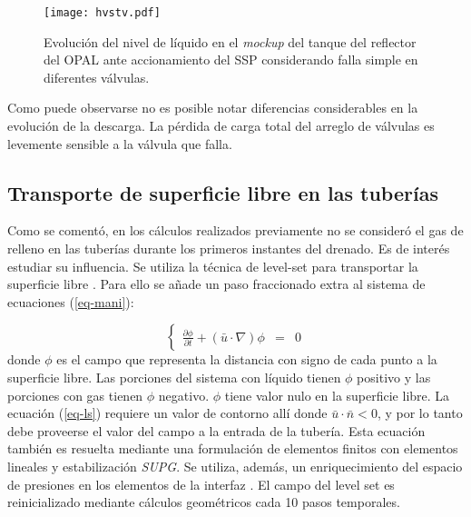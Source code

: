 \begin{figure}[ht]
\centering
\texttt{[image: hvstv.pdf]}
\caption[Evolución del nivel de líquido en el \textit{mockup} del tanque del reflector del OPAL ante accionamiento del SSP considerando falla simple en diferentes válvulas]
{Evolución del nivel de líquido en el \textit{mockup} del tanque del reflector del OPAL ante accionamiento del SSP considerando falla simple en diferentes válvulas.}
\label{hvstv} 
\end{figure}

Como puede observarse no es posible notar diferencias considerables en la evolución de la descarga.
La pérdida de carga total del arreglo de válvulas es levemente sensible a la válvula que falla.

\subsection*{Transporte de superficie libre en las tuberías}
\label{3:level-set}

Como se comentó, en los cálculos realizados previamente no se consideró el gas de relleno en las tuberías durante los primeros instantes del drenado.
Es de interés estudiar su influencia.
Se utiliza la técnica de level-set para transportar la superficie libre \cite{level-set}.
Para ello se añade un paso fraccionado extra al sistema de ecuaciones (\ref{eq-mani}):

\begin{equation}
\left\{ \begin{array}{rcl}
\displaystyle \frac{\partial\phi}{\partial t}+ (\bar{u} \cdot \nabla) \phi &=& 0
\label{eq-ls}
\end{array} \right.
\end{equation}
donde $\phi$ es el campo que representa la distancia con signo de cada punto a la superficie libre.
Las porciones del sistema con líquido tienen $\phi$ positivo y las porciones con gas tienen $\phi$ negativo.
$\phi$ tiene valor nulo en la superficie libre.
La ecuación (\ref{eq-ls}) requiere un valor de contorno allí donde $\bar{u} \cdot \bar{n} < 0$,
y por lo tanto debe proveerse el valor del campo a la entrada de la tubería.
Esta ecuación también es resuelta mediante una formulación de elementos finitos con elementos lineales y estabilización \textit{SUPG}.
Se utiliza, además, un enriquecimiento del espacio de presiones en los elementos de la interfaz \cite{enriq}.
El campo del level set es reinicializado mediante cálculos geométricos cada 10 pasos temporales.

